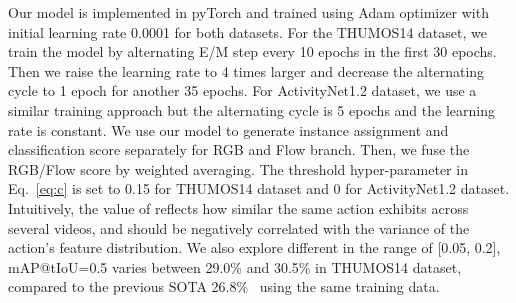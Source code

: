 \documentclass[runningheads]{llncs}
\begin{document}
\smallskip
Our model is implemented in pyTorch and trained using Adam optimizer with initial learning rate 0.0001 for both datasets. For the THUMOS14 dataset, we train the model by alternating E/M step every 10 epochs in the first 30 epochs. Then we raise the learning rate to 4 times larger and decrease the alternating cycle to 1 epoch for another 35 epochs. For ActivityNet1.2 dataset, we use a similar training approach but the alternating cycle is 5 epochs and the learning rate is constant. 
We use our model to generate instance assignment  and classification score  separately for RGB and Flow branch. Then, we fuse the RGB/Flow score by weighted averaging. The threshold hyper-parameter  in Eq.~\ref{eq:c} is set to 0.15 for THUMOS14 dataset and 0 for ActivityNet1.2 dataset. Intuitively, the value of  reflects how similar the same action exhibits across several videos, and should be negatively correlated with the variance of the action's feature distribution. We also explore different  in the range of [0.05, 0.2], mAP@tIoU=0.5 varies between 29.0\% and 30.5\% in THUMOS14 dataset, compared to the previous SOTA 26.8\%~\cite{nguyen2019weakly} using the same training data. 
\end{document}
